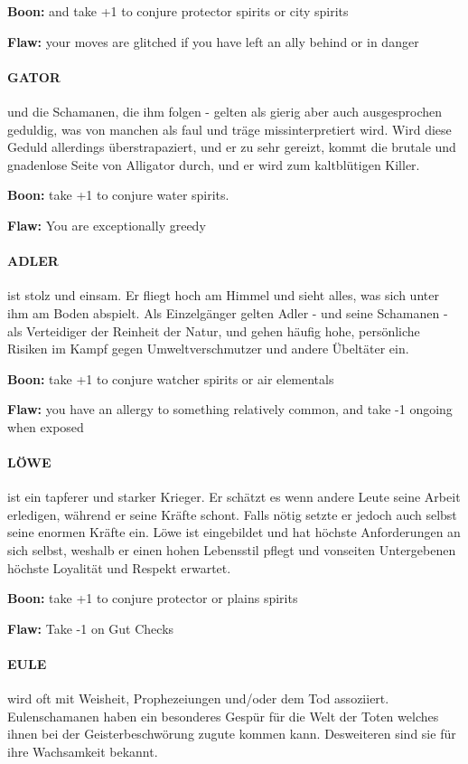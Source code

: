 \textbf{Boon:} and take +1 to conjure protector spirits or city spirits

\textbf{Flaw:} your moves are glitched if you have left an ally behind or in danger


\paragraph{GATOR} und die Schamanen, die ihm folgen - gelten als gierig aber auch ausgesprochen geduldig, was von manchen als faul und träge missinterpretiert wird. Wird diese Geduld allerdings überstrapaziert, und er zu sehr gereizt, kommt die brutale und gnadenlose Seite von Alligator durch, und er wird zum kaltblütigen Killer. 

\textbf{Boon:} take +1 to conjure water spirits.

\textbf{Flaw:} You are exceptionally greedy


\paragraph{ADLER} ist stolz und einsam. Er fliegt hoch am Himmel und sieht alles, was sich unter ihm am Boden abspielt. Als Einzelgänger gelten Adler - und seine Schamanen - als Verteidiger der Reinheit der Natur, und gehen häufig hohe, persönliche Risiken im Kampf gegen Umweltverschmutzer und andere Übeltäter ein.

\textbf{Boon:} take +1 to conjure watcher spirits or air elementals

\textbf{Flaw:} you have an allergy to something relatively common, and take -1 ongoing when exposed


\paragraph{LÖWE} ist ein tapferer und starker Krieger. Er schätzt es wenn andere Leute seine Arbeit erledigen, während er seine Kräfte schont. Falls nötig setzte er jedoch auch selbst seine enormen Kräfte ein. Löwe ist eingebildet und hat höchste Anforderungen an sich selbst, weshalb er einen hohen Lebensstil pflegt und vonseiten Untergebenen höchste Loyalität und Respekt erwartet. 

\textbf{Boon:} take +1 to conjure protector or plains spirits

\textbf{Flaw:} Take -1 on Gut Checks


\paragraph{EULE} wird oft mit Weisheit, Prophezeiungen und/oder dem Tod assoziiert. Eulenschamanen haben ein besonderes Gespür für die Welt der Toten welches ihnen bei der Geisterbeschwörung zugute kommen kann. Desweiteren sind sie für ihre Wachsamkeit bekannt. 

